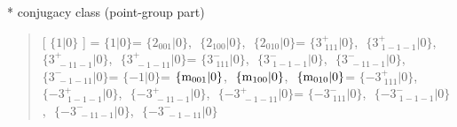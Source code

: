 \documentclass[fleqn,10pt,landscape]{jsarticle}
\begin{document}
* conjugacy class (point-group part)
\begin{quote}
[ $\{1|0\}$ ] = \quad $\{1|0\}$\newline[ $\{2{}_{001}|0\}$ ] = \quad $\{2{}_{001}|0\}$,\,\, $\{2{}_{100}|0\}$,\,\, $\{2{}_{010}|0\}$\newline[ $\{3^{+}_{\,\,111}|0\}$ ] = \quad $\{3^{+}_{\,\,111}|0\}$,\,\, $\{3^{+}_{\,\,1-1-1}|0\}$,\,\, $\{3^{+}_{\,\,-11-1}|0\}$,\,\, $\{3^{+}_{\,\,-1-11}|0\}$\newline[ $\{3^{-}_{\,\,111}|0\}$ ] = \quad $\{3^{-}_{\,\,111}|0\}$,\,\, $\{3^{-}_{\,\,1-1-1}|0\}$,\,\, $\{3^{-}_{\,\,-11-1}|0\}$,\,\, $\{3^{-}_{\,\,-1-11}|0\}$\newline[ $\{-1|0\}$ ] = \quad $\{-1|0\}$\newline[ $\{{\rm m}_{001}|0\}$ ] = \quad $\{{\rm m}_{001}|0\}$,\,\, $\{{\rm m}_{100}|0\}$,\,\, $\{{\rm m}_{010}|0\}$\newline[ $\{-3^{+}_{\,\,111}|0\}$ ] = \quad $\{-3^{+}_{\,\,111}|0\}$,\,\, $\{-3^{+}_{\,\,1-1-1}|0\}$,\,\, $\{-3^{+}_{\,\,-11-1}|0\}$,\,\, $\{-3^{+}_{\,\,-1-11}|0\}$\newline[ $\{-3^{-}_{\,\,111}|0\}$ ] = \quad $\{-3^{-}_{\,\,111}|0\}$,\,\, $\{-3^{-}_{\,\,1-1-1}|0\}$,\,\, $\{-3^{-}_{\,\,-11-1}|0\}$,\,\, $\{-3^{-}_{\,\,-1-11}|0\}$\newline
\end{quote}
\end{document}
